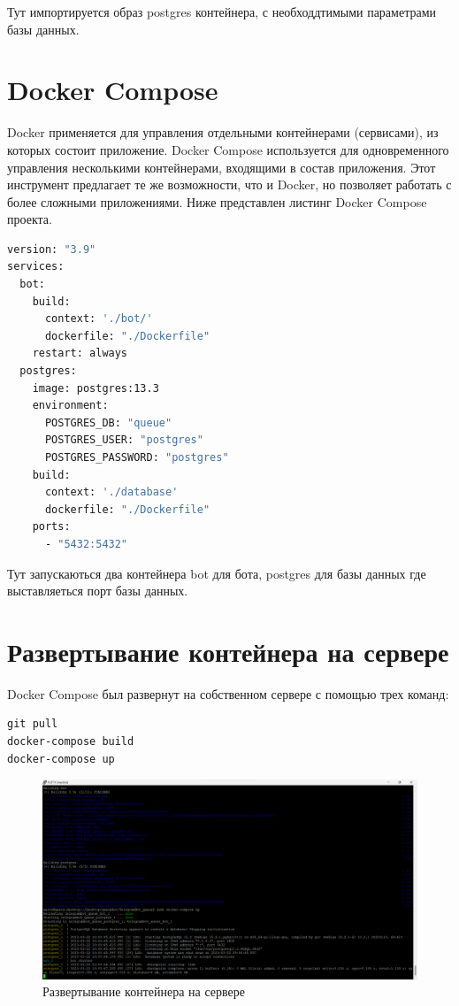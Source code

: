 Тут импортируется образ postgres контейнера, с необходдтимыми параметрами
базы данных.


\section{Docker Compose}
Docker применяется для управления отдельными контейнерами (сервисами),
из которых состоит приложение. Docker Compose используется для одновременного
управления несколькими контейнерами, входящими в состав приложения.
Этот инструмент предлагает те же возможности, что и Docker,
но позволяет работать с более сложными приложениями.
Ниже представлен листинг Docker Compose проекта.

\begin{lstlisting}[language=Dockerfile
	, caption=\leftline{Dockerfile базы данных}
	, label=lst:DС
	, columns=flexible
	]
version: "3.9"
services:
  bot:
    build:
      context: './bot/'
      dockerfile: "./Dockerfile"
    restart: always
  postgres:
    image: postgres:13.3
    environment:
      POSTGRES_DB: "queue"
      POSTGRES_USER: "postgres"
      POSTGRES_PASSWORD: "postgres"
    build:
      context: './database'
      dockerfile: "./Dockerfile"
    ports:
      - "5432:5432"
\end{lstlisting}

Тут запускаються два контейнера bot для бота, postgres для базы данных
где выставляеться порт базы данных.

\section{Развертывание контейнера на сервере}
Docker Compose был развернут на собственном сервере с помощью трех команд:

\begin{verbatim}
git pull
docker-compose build
docker-compose up
\end{verbatim}

\begin{figure}[h!tp]
  \centering
  \includegraphics[width=1\textwidth]{server_run}
  \caption{Развертывание контейнера на сервере}
  \label{fig:server:run}
\end{figure}

